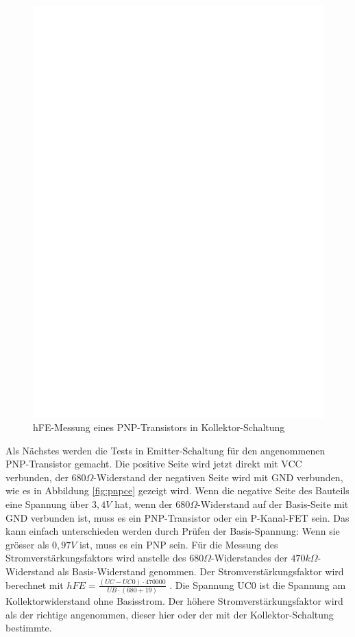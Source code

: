 \begin{figure}[H]
\centering
\includegraphics[]{../FIG/PNPcc.eps}
\caption{hFE-Messung eines PNP-Transistors in Kollektor-Schaltung}
\label{fig:pnpcc}
\end{figure}

Als Nächstes werden die Tests in Emitter-Schaltung für den angenommenen PNP-Transistor gemacht.
Die positive Seite wird jetzt direkt mit VCC verbunden, der \(680\Omega\)-Widerstand der negativen Seite wird 
mit GND verbunden, wie es in Abbildung \ref{fig:pnpce} gezeigt wird. 
Wenn die negative Seite des Bauteils eine Spannung über \(3,4V\) hat, wenn der \(680\Omega\)-Widerstand auf der Basis-Seite mit
GND verbunden ist, muss es ein PNP-Transistor oder ein P-Kanal-FET sein.
Das kann einfach unterschieden werden durch Prüfen der Basis-Spannung: Wenn sie grösser als \(0,97V\) ist, muss es ein PNP sein.
Für die Messung des Stromverstärkungsfaktors wird anstelle des \(680\Omega\)-Widerstandes der
 \(470k\Omega\)-Widerstand als Basis-Widerstand genommen.
Der Stromverstärkungsfaktor wird berechnet mit \(hFE = \frac{(UC-UC0) \cdot 470000}{UB \cdot (680+19)}\) .
Die Spannung UC0 ist die Spannung am Kollektorwiderstand ohne Basisstrom.
Der höhere Stromverstärkungsfaktor wird als der richtige angenommen, dieser hier oder der
mit der Kollektor-Schaltung bestimmte.


